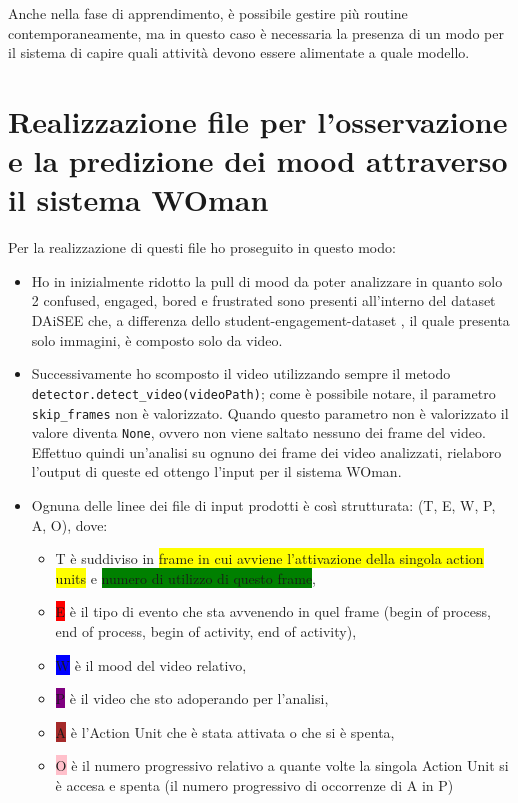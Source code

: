 Anche nella fase di apprendimento, è possibile gestire più routine contemporaneamente, ma in questo caso è necessaria la presenza di un modo per il sistema di capire quali attività devono essere alimentate a quale modello.

\section{Realizzazione file per l’osservazione e la predizione dei mood attraverso il sistema WOman}

Per la realizzazione di questi file ho proseguito in questo modo:
\begin{itemize}
    \item Ho in inizialmente ridotto la pull di mood da poter analizzare in quanto solo 2 confused, engaged, bored e frustrated sono presenti all’interno del dataset DAiSEE \cite{DAiSEE} che, a differenza dello student-engagement-dataset \cite{StudEngagDataset}, il quale presenta solo immagini, è composto solo da video.
    \item Successivamente ho scomposto il video utilizzando sempre il metodo \texttt{detector.detect_video(videoPath)}; come è possibile notare, il parametro \texttt{skip_frames} non è valorizzato. Quando questo parametro non è valorizzato il valore diventa \texttt{None}, ovvero non viene saltato nessuno dei frame del video.
    Effettuo quindi un’analisi su ognuno dei frame dei video analizzati, rielaboro l’output di queste ed ottengo l’input per il sistema WOman.
    \item Ognuna delle linee dei file di input prodotti è così strutturata: (T, E, W, P, A, O), dove: 
    \begin{itemize}
        \item T è suddiviso in \colorbox{yellow}{frame in cui avviene l'attivazione della singola action} \colorbox{yellow}{units} e \colorbox{green}{numero di utilizzo di questo frame},
        \item \colorbox{red}{E} è il tipo di evento che sta avvenendo in quel frame (begin of process, end of process, begin of activity, end of activity), 
        \item \colorbox{blue}{W} è il mood del video relativo,
        \item \colorbox{purple}{P} è il video che sto adoperando per l’analisi, 
        \item \colorbox{brown}{A} è l’Action Unit che è stata attivata o che si è spenta,
        \item \colorbox{pink}{O} è il numero progressivo relativo a quante volte la singola Action Unit si è accesa e spenta (il numero progressivo di occorrenze di A in P) 
    \end{itemize}
\end{itemize}

